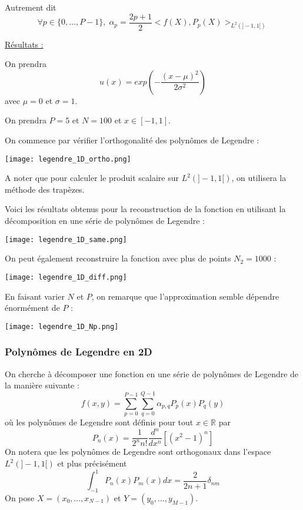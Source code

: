 Autrement dit
$$\forall p\in\{0,\dots,P-1\}, \; \alpha_p = \frac{2p+1}{2}<f(X),P_p(X)>_{L^2(]-1,1[)}$$

\underline{Résultats :}

On prendra
$$u(x)=exp\left(-\frac{(x-\mu)^2}{2\sigma^2}\right)$$
avec $\mu=0$ et $\sigma=1$.

On prendra $P=5$ et $N=100$ et $x\in[-1,1]$.

On commence par vérifier l'orthogonalité des polynômes de Legendre :

\begin{minipage}{\linewidth}
	\centering
	\texttt{[image: legendre\_1D\_ortho.png]}
\end{minipage}

\begin{Rem}
	A noter que pour calculer le produit scalaire sur $L^2(]-1,1[)$, on utilisera la méthode des trapèzes.
\end{Rem}

Voici les résultats obtenus pour la reconstruction de la fonction en utilisant la décomposition en une série de polynômes de Legendre :

\begin{minipage}{\linewidth}
	\centering
	\texttt{[image: legendre\_1D\_same.png]}
\end{minipage}

On peut également reconstruire la fonction avec plus de points $N_2=1000$ :

\begin{minipage}{\linewidth}
	\centering
	\texttt{[image: legendre\_1D\_diff.png]}
\end{minipage}

En faisant varier $N$ et $P$, on remarque que l'approximation semble dépendre énormément de $P$ :

\begin{minipage}{\linewidth}
	\centering
	\texttt{[image: legendre\_1D\_Np.png]}
\end{minipage}

\subsubsection{Polynômes de Legendre en 2D}

On cherche à décomposer une fonction en une série de polynômes de Legendre de la manière suivante :
\begin{equation}
	f(x,y)=\sum_{p=0}^{P-1}\sum_{q=0}^{Q-1}\alpha_{p,q}P_p(x)P_q(y)
	\label{decomp}
\end{equation}
où les polynômes de Legendre sont définis pour tout $x\in\mathbb{R}$ par
$$P_n(x)=\frac{1}{2^n n!}\frac{d^n}{dx^n}[(x^2-1)^n]$$
On notera que les polynômes de Legendre sont orthogonaux dans l'espace $L^2(]-1,1[)$ et plus précisément
\begin{equation}
	\int_{-1}^1 P_n(x)P_m(x)dx=\frac{2}{2n+1}\delta_{nm} 
	\label{ortho}
\end{equation}
On pose $X=(x_0,\dots,x_{N-1})$ et $Y=(y_0,\dots,y_{M-1})$.

